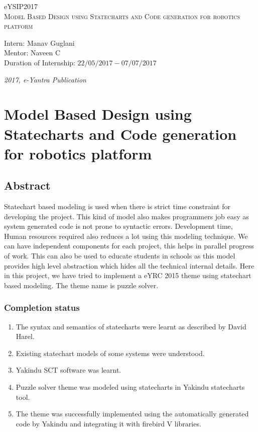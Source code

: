 \documentclass[a4paper,12pt,oneside]{book}
\begin{document}
\begin{titlepage}
\raggedright
{\Large eYSIP2017\\[1cm]}
{\Huge\scshape Model Based Design using Statecharts and Code generation for robotics platform \\[.1in]}
\vfill
\begin{flushright}
{\large Intern: Manav Guglani \\}
{\large Mentor: Naveen C \\}
{\large Duration of Internship: $ 22/05/2017-07/07/2017 $ \\}
\end{flushright}

{\itshape 2017, e-Yantra Publication}
\end{titlepage}

\chapter[Project Tag]{ Model Based Design using Statecharts and Code generation for robotics platform}
\section*{Abstract}
Statechart based modeling is used when there is strict time constraint for developing the project. This kind of model also makes programmers job easy as system generated code is not prone to syntactic errors. Development time, Human
resources required also reduces a lot using this modeling technique. We can have
independent components for each project, this helps in parallel progress of work.
This can also be used to educate students in schools as this model provides high
level abstraction which hides all the technical internal details. Here in this project, we have tried to implement a eYRC 2015 theme using statechart based modeling. The theme name is puzzle solver.
\subsection*{Completion status}
\begin{enumerate}
\item The syntax and semantics of statecharts were learnt as described by David Harel. 
\item Existing statechart models of some systems were understood. 
\item Yakindu SCT software was learnt. 
\item Puzzle solver theme was modeled using statecharts in Yakindu statecharts tool.
\item The theme was successfully implemented using the automatically generated code by Yakindu and integrating it with firebird V libraries. 
\end{enumerate}
\end{document}
